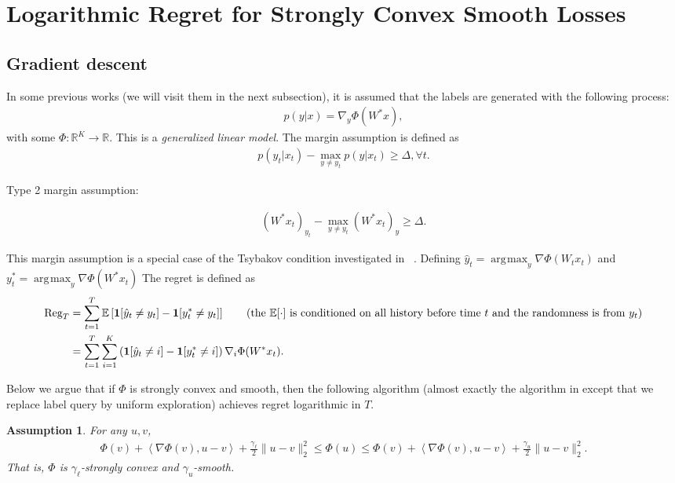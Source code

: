 \documentclass{article}
\newcommand{\Reg}{\text{\rm Reg}}
\newcommand{\one}{\boldsymbol{1}}
\newcommand{\nb}{\nabla}
\newcommand{\field}[1]{\mathbb{#1}}
\newcommand{\E}{\field{E}}
\newcommand{\inner}[1]{ \left\langle {#1} \right\rangle }
\newtheorem{assumption}{Assumption}
\DeclareMathOperator*{\argmax}{\arg\!\max}
\begin{document}
\section{Logarithmic Regret for Strongly Convex Smooth Losses}
\subsection{Gradient descent}
In some previous works (we will visit them in the next subsection), it is assumed that the labels are generated with the following process: 
\begin{align}
    p(y|x) = \nabla_y\Phi(W^*x), 
\end{align}
with some $\Phi: \mathbb{R}^K \rightarrow \mathbb{R}$. This is a \textit{generalized linear model}.  
The margin assumption is defined as 
\begin{align}
    p(y_t|x_t) - \max_{y\neq y_t}p(y|x_t) \geq \Delta, \forall t.  \label{eqn:new margin}
\end{align}

{\color{blue} Type 2 margin assumption: }\\
{\color{blue} 
\begin{align}
    (W^*x_t)_{y_t} - \max_{y\neq y_t}(W^*x_t)_{y} \geq \Delta. 
\end{align}

}

This margin assumption is a special case of the Tsybakov condition investigated in ~\cite{agarwal2013selective}. 
Defining $\hat{y}_t = \argmax_y \nabla\Phi(W_tx_t)$ and $y^*_t = \argmax_y \nabla\Phi(W^*x_t) $ The regret is defined as
\begin{align}
    \Reg_T &= \sum_{t=1}^T \E\left[ \one[\hat{y}_t\neq y_t] - \one[y_t^*\neq y_t]\right] \tag{the $\E[\cdot]$ is conditioned on all history before time $t$ and the randomness is from $y_t$} \\
    &= \sum_{t=1}^T \sum_{i=1}^K \left(\one[\hat{y}_t\neq i] - \one[y^*_t\neq i]\right)\nabla_i\Phi(W^*x_t). \label{eqn:new regret}
\end{align}

Below we argue that if $\Phi$ is strongly convex and smooth, then the following algorithm (almost exactly the algorithm in \cite{agarwal2013selective} except that we replace label query by uniform exploration) achieves regret logarithmic in $T$. 

\begin{assumption}
For any $u,v$, 
\begin{align*}
     \Phi(v) + \inner{\nb\Phi(v),u-v} + \frac{\gamma_\ell}{2}\|u-v\|_2^2 \leq \Phi(u)\leq \Phi(v) + \inner{\nb\Phi(v),u-v} + \frac{\gamma_u}{2}\|u-v\|_2^2. 
\end{align*}
That is, $\Phi$ is $\gamma_\ell$-strongly convex and $\gamma_u$-smooth. 
\end{assumption}
\end{document}
